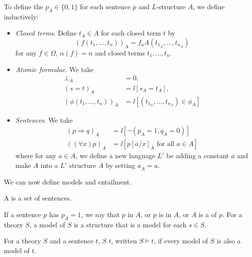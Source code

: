 \documentclass[a4paper, 10pt, twocolumn]{amsart}
\begin{document}
\begin{definition}[Interpretation]
  To define the  $p_A \in \{0, 1\}$ for each sentence $p$ and $L$-structure $A$, we define inductively:
  \begin{itemize}
    \item \emph{Closed terms}. Define $t_A \in A$ for each closed term $t$ by
    $$
    (f(t_1, \dots, t_n))_A = f_aA(t_{1_A}, \dots, t_{n_A}) 
    $$
    for any $f \in \Omega$, $\alpha(f) = n$ and closed terms $t_1, \dots, t_n$.
    \item \emph{Atomic formulae}. We take
    \begin{align*}
      \bot_A &=0,\\
      (s = t)_A &= \ii[s_A = t_A],\\
      (\phi(t_1, \dots, t_n))_A &= \ii[(t_{1_A}, \dots, t_{n_A}) \in \phi_A]
    \end{align*}
    \item \emph{Sentences}. We take
    \begin{align*}
      (p \Rightarrow q)_A &= \ii[\lnot(p_A = 1, q_A = 0)] \\
      ((\forall x)p)_A &= \ii[p[\overline{a}/x]_{\overline{A}}\text{ for all }a\in A]
    \end{align*}
    where for any $a \in A$, we define a new language $L'$ be adding a constant $\overline{a}$ and make $A$ into a $L'$ structure $\overline{A}$ by setting $\overline{a}_{\overline{A}} = a$.
  \end{itemize}
\end{definition}

We can now define models and entailment.

\begin{definition}[Theory]
  A  is a set of sentences.
\end{definition}

\begin{definition}[Model]
  If a sentence $p$ has $p_A = 1$, we say that $p$  in $A$, or $p$ is  in $A$, or $A$ is a  of $p$. For a theory $S$, a model of $S$ is a structure that is a model for each $s \in S$.
\end{definition}

\begin{definition}
  For a theory $S$ and a sentence $t$, $S$  $t$, written $S \models t$, if every model of $S$ is also a model of $t$.
\end{definition}
\end{document}
